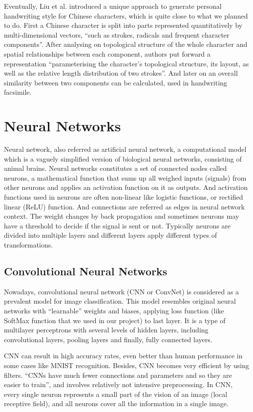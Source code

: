 Eventually, Liu et al.\cite{6376394} introduced a unique approach to generate personal handwriting style for Chinese characters, which is quite close to what we planned to do. First a Chinese character is split into parts represented quantitatively by multi-dimensional vectors, ``such as strokes, radicals and frequent character components''. After analysing on topological structure of the whole character and spatial relationships between each component, authors put forward a representation ``parameterising the character's topological structure, its layout, as well as the relative length distribution of two strokes''. And later on an overall similarity between two components can be calculated, used in handwriting facsimile.

\section{Neural Networks}
Neural network, also referred as artificial neural network, a computational model which is a vaguely simplified version of biological neural networks, consisting of animal brains. Neural networks constitutes a set of connected nodes called neurons, a mathematical function that sums up all weighed inputs (signals) from other neurons and applies an activation function on it as outputs. And activation functions used in neurons are often non-linear like logistic functions, or rectified linear (ReLU) function. And connections are referred as edges in neural network context. The weight changes by back propagation and sometimes neurons may have a threshold to decide if the signal is sent or not. Typically neurons are divided into multiple layers and different layers apply different types of transformations.

\subsection{Convolutional Neural Networks}
Nowadays, convolutional neural network (CNN or ConvNet) is considered as a prevalent model for image classification. This model resembles original neural networks with ``learnable'' weights and biases, applying loss function (like SoftMax function that we used in our project) to last layer. It is a type of multilayer perceptrons with several levels of hidden layers, including convolutional layers, pooling layers and finally, fully connected layers.

CNN can result in high accuracy rates, even better than human performance in some cases like MNIST recognition. Besides, CNN becomes very efficient by using filters. ``CNNs have much fewer connections and parameters and so they are easier to train''\cite{Krizhevsky:2012:ICD:2999134.2999257}, and involves relatively not intensive preprocessing. In CNN, every single neuron represents a small part of the vision of an image (local receptive field), and all neurons cover all the information in a single image.

